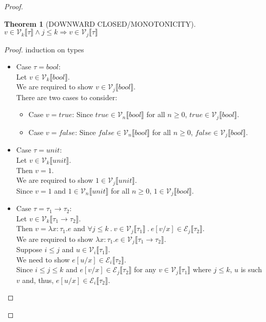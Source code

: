 \documentclass{article}
\newtheorem*{theorem}{Theorem}
\begin{document}
\begin{proof}
\newpage
\begin{theorem} [DOWNWARD CLOSED/MONOTONICITY]
  $v \in \mathcal{V}_k \llbracket \tau \rrbracket \wedge j \leq k \Rightarrow v \in \mathcal{V}_j \llbracket \tau \rrbracket$
\end{theorem}

\begin{proof} induction on types
  \begin{itemize}
  \item Case $\tau = bool$:\\
    Let $v \in \mathcal{V}_k \llbracket bool \rrbracket$.\\
    We are required to show $v \in \mathcal{V}_j \llbracket bool \rrbracket$.\\
    There are two cases to consider:
    \begin{itemize}
    \item Case $v = true$: Since $true \in \mathcal{V}_n \llbracket bool \rrbracket$ for all $n \geq 0$, $true \in \mathcal{V}_j \llbracket bool \rrbracket$.
    \item Case $v = false$: Since $false \in \mathcal{V}_n \llbracket bool \rrbracket$ for all $n \geq 0$, $false \in \mathcal{V}_j \llbracket bool \rrbracket$.
    \end{itemize}

  \item Case $\tau = unit$:\\
    Let $v \in \mathcal{V}_k \llbracket unit \rrbracket$.\\
    Then $v = 1$.\\
    We are required to show $1 \in \mathcal{V}_j \llbracket unit \rrbracket$.\\
    Since $v = 1$ and $1 \in \mathcal{V}_n \llbracket unit \rrbracket$ for all $n \geq 0$, $1 \in \mathcal{V}_j \llbracket bool \rrbracket$.

  \item Case $\tau = \tau_1 \rightarrow \tau_2$:\\
    Let $v \in \mathcal{V}_k \llbracket \tau_1 \rightarrow \tau_2 \rrbracket$.\\
    Then $v = \lambda x:\tau_1.e$ and $\forall j \leq k ~.~ v \in \mathcal{V}_j \llbracket \tau_1 \rrbracket ~.~ e[v/x] \in \mathcal{E}_j \llbracket \tau_2 \rrbracket$.\\
    We are required to show $\lambda x:\tau_1.e \in \mathcal{V}_j \llbracket \tau_1 \rightarrow \tau_2 \rrbracket$.\\
    Suppose $i \leq j$ and $u \in \mathcal{V}_i \llbracket \tau_1 \rrbracket$.\\
    We need to show $e[u/x] \in \mathcal{E}_i \llbracket \tau_2 \rrbracket$.\\
    Since $i \leq j \leq k$ and $e[v/x] \in \mathcal{E}_j \llbracket \tau_2 \rrbracket$ for any $v \in \mathcal{V}_j \llbracket \tau_1 \rrbracket$ where $j \leq k$, $u$ is such $v$ and, thus, $e[u/x] \in \mathcal{E}_i \llbracket \tau_2 \rrbracket$.\\


\end{itemize}
\end{proof}
\end{proof}
\end{document}
